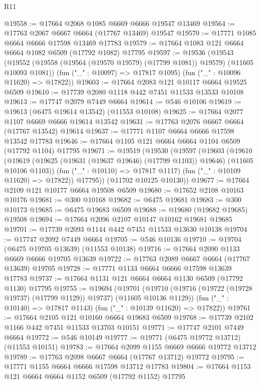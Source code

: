 \begin{lexlean}{R11}
\begin{coremodule}
@19558 := @17664 @2068 @1085 @6669 @6666 @19547 @13469
@19564 := @17763 @2067 @6667 @6664 (@17767 @13469) @19547
@19570 := @17771 @1085 @6664 @6666 @17598 @13469 @17783
@19579 := @17664 @1083 @121 @6664 @6664 @1082 @6509 (@17792 @1082) @17795
@19597 := @19536
    (@19543
      (@19552 (@19558 (@19564 (@19570 @19579) (@17799 @1081)) @19579) (@11605 @10093 @1081))
      (fun ("_" : @10097) => @17817 @1095)
      (fun ("_" : @10096 @11620) => @17822))
@19603 := @17664 @2083 @121 @10117 @6664 @19525 @6509
@19610 := @17739 @2080 @1118 @442 @7451 @11533 @13533 @10108
@19613 := @17747 @2079 @7449 @6664
@19614 := @546 @10106
@19619 := @19613 (@6475 @19614 @13542) (@11553 @10108)
@19625 := @17664 @2077 @1107 @6669 @6666 @19614 @13542
@19631 := @17763 @2076 @6667 @6664 (@17767 @13542) @19614
@19637 := @17771 @1107 @6664 @6666 @17598 @13542 @17783
@19646 := @17664 @1105 @121 @6664 @6664 @1104 @6509 (@17792 @1104) @17795
@19671 := @19519
    (@19530
      (@19597
        (@19603
          (@19610
            (@19619 (@19625 (@19631 (@19637 @19646) (@17799 @1103)) @19646) (@11605 @10106 @1103))
            (fun ("_" : @10110) => @17817 @1117)
            (fun ("_" : @10109 @11620) => @17822))
          @17795))
      (@11702 @10125 @10130))
@19677 := @17664 @2109 @121 @10177 @6664 @19508 @6509
@19680 := @17652 @2108 @10163 @10176
@19681 := @300 @10168
@19682 := @6475 @19681
@19683 := @300 @10173
@19685 := @6475 @19683 @6509
@19688 := @19680 (@19682 @19685) @19508
@19694 := @17664 @2096 @2107 @10147 @10162 @19681 @19685
@19701 := @17739 @2093 @1144 @442 @7451 @11533 @13630 @10138
@19704 := @17747 @2092 @7449 @6664
@19705 := @546 @10136
@19710 := @19704 (@6475 @19705 @13639) (@11553 @10138)
@19716 := @17664 @2090 @1133 @6669 @6666 @19705 @13639
@19722 := @17763 @2089 @6667 @6664 (@17767 @13639) @19705
@19728 := @17771 @1133 @6664 @6666 @17598 @13639 @17783
@19737 := @17664 @1131 @121 @6664 @6664 @1130 @6509 (@17792 @1130) @17795
@19755 := @19694
    (@19701
      (@19710 (@19716 (@19722 (@19728 @19737) (@17799 @1129)) @19737) (@11605 @10136 @1129))
      (fun ("_" : @10140) => @17817 @1143)
      (fun ("_" : @10139 @11620) => @17822))
@19761 := @17664 @2105 @121 @10160 @6664 @19683 @6509
@19768 := @17739 @2102 @1166 @442 @7451 @11533 @13703 @10151
@19771 := @17747 @2101 @7449 @6664
@19772 := @546 @10149
@19777 := @19771 (@6475 @19772 @13712) (@11553 @10151)
@19783 := @17664 @2099 @1155 @6669 @6666 @19772 @13712
@19789 := @17763 @2098 @6667 @6664 (@17767 @13712) @19772
@19795 := @17771 @1155 @6664 @6666 @17598 @13712 @17783
@19804 := @17664 @1153 @121 @6664 @6664 @1152 @6509 (@17792 @1152) @17795

\end{coremodule}
\end{lexlean}

